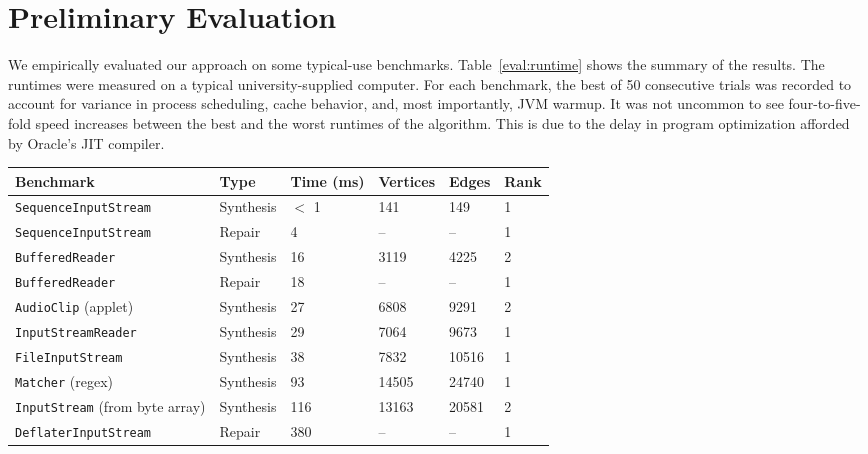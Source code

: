 \section{Preliminary Evaluation}
\label{sec:evaluation}

We empirically evaluated our approach on some typical-use benchmarks. Table~\ref{eval:runtime} shows the summary of the results. The runtimes were measured on a typical university-supplied computer. For each benchmark, the best of 50 consecutive trials was recorded to account for variance in process scheduling, cache behavior, and, most importantly, JVM warmup. It was not uncommon to see four-to-five-fold speed increases between the best and the worst runtimes of the algorithm. This is due to the delay in program optimization afforded by Oracle's JIT compiler.

\begin{table*}[t]
  \centering
  \renewcommand{\arraystretch}{1.25}
  \begin{tabularx}{\textwidth}{| X | l | l | l | l | l |}
    \hline
    \textbf{Benchmark} & \textbf{Type} & \textbf{Time (ms)} & \textbf{Vertices} & \textbf{Edges} & \textbf{Rank} \\ \hline
	\texttt{SequenceInputStream} & Synthesis & $<$ 1 & 141   & 149   & 1 \\ \hline
	\texttt{SequenceInputStream} & Repair    & 4   & --    & --    & 1 \\ \hline
    \texttt{BufferedReader}      & Synthesis & 16  & 3119  & 4225  & 2 \\ \hline
    \texttt{BufferedReader}      & Repair    & 18  & --    & --    & 1 \\ \hline
    \texttt{AudioClip} (applet)  & Synthesis & 27  & 6808  & 9291  & 2 \\ \hline
    \texttt{InputStreamReader}   & Synthesis & 29  & 7064  & 9673  & 1 \\ \hline
    \texttt{FileInputStream}     & Synthesis & 38  & 7832  & 10516 & 1 \\ \hline
    \texttt{Matcher} (regex)     & Synthesis & 93  & 14505 & 24740 & 1 \\ \hline
    \texttt{InputStream} (from byte array) & Synthesis & 116 & 13163  & 20581  & 2 \\ \hline
    \texttt{DeflaterInputStream} & Repair    & 380 & -- & -- & 1 \\ \hline
  \end{tabularx}
  \caption{Typical-use runtimes in various benchmarks. ``Vertices'' and ``Edges'' refer to the size of the searched subgraph, and ``Rank'' indicates the correct expression's position among the results. The entire Java standard library was used to build the graph before running the benchmarks. Each test case was initialized with a small environment consisting of five variables.}
  \label{eval:runtime}
\end{table*}


